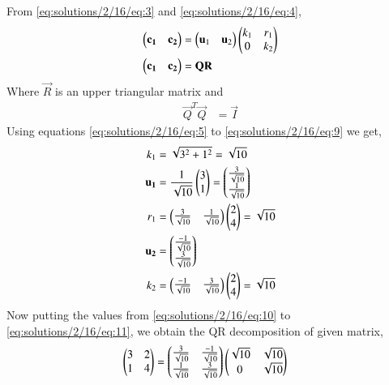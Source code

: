 From \eqref{eq:solutions/2/16/eq:3} and \eqref{eq:solutions/2/16/eq:4}, 
\begin{align}
\begin{pmatrix}\mathbf{c_1} & \mathbf{c_2}\end{pmatrix} &= \begin{pmatrix}\mathbf{u}_1 & \mathbf{u}_2\end{pmatrix}\begin{pmatrix}k_1 & r_1 \\ 0 & k_2\end{pmatrix} \\
\begin{pmatrix}\mathbf{c_1} & \mathbf{c_2}\end{pmatrix} &= \mathbf{Q}\mathbf{R}
\end{align}
Where $\vec{R}$ is an upper triangular matrix and
\begin{align}
\vec{Q}^T\vec{Q}&=\vec{I}
\end{align}
Using equations \eqref{eq:solutions/2/16/eq:5} to \eqref{eq:solutions/2/16/eq:9} we get, 
\begin{align}
    k_1 &= \sqrt{3^2+1^2}=\sqrt{10} \label{eq:solutions/2/16/eq:10}\\
    \mathbf{u_1} &= \frac{1}{\sqrt{10}}\begin{pmatrix}3\\1\end{pmatrix}= \begin{pmatrix}\frac{3}{\sqrt{10}} \\ \frac{1}{\sqrt{10}}\end{pmatrix} \\
    r_1 &= \begin{pmatrix}\frac{3}{\sqrt{10}} & \frac{1}{\sqrt{10}}\end{pmatrix}\begin{pmatrix}2\\4\end{pmatrix}=\sqrt{10} \\
    \mathbf{u_2} &= \begin{pmatrix}\frac{-1}{\sqrt{10}} \\ \frac{3}{\sqrt{10}}\end{pmatrix} \\
    k_2 &= \begin{pmatrix}\frac{-1}{\sqrt{10}} & \frac{3}{\sqrt{10}}\end{pmatrix}\begin{pmatrix}2\\4\end{pmatrix} = \sqrt{10} \label{eq:solutions/2/16/eq:11}
\end{align}
Now putting the values from \eqref{eq:solutions/2/16/eq:10} to \eqref{eq:solutions/2/16/eq:11}, we obtain the QR decomposition of given matrix, 
\begin{align}
    \begin{pmatrix}3&2\\1&4\end{pmatrix} &= \begin{pmatrix}\frac{3}{\sqrt{10}}&\frac{-1}{\sqrt{10}}\\\frac{1}{\sqrt{10}}&\frac{3}{\sqrt{10}}\end{pmatrix}\begin{pmatrix}\sqrt{10}&\sqrt{10}\\0&\sqrt{10}\end{pmatrix}
\end{align}

